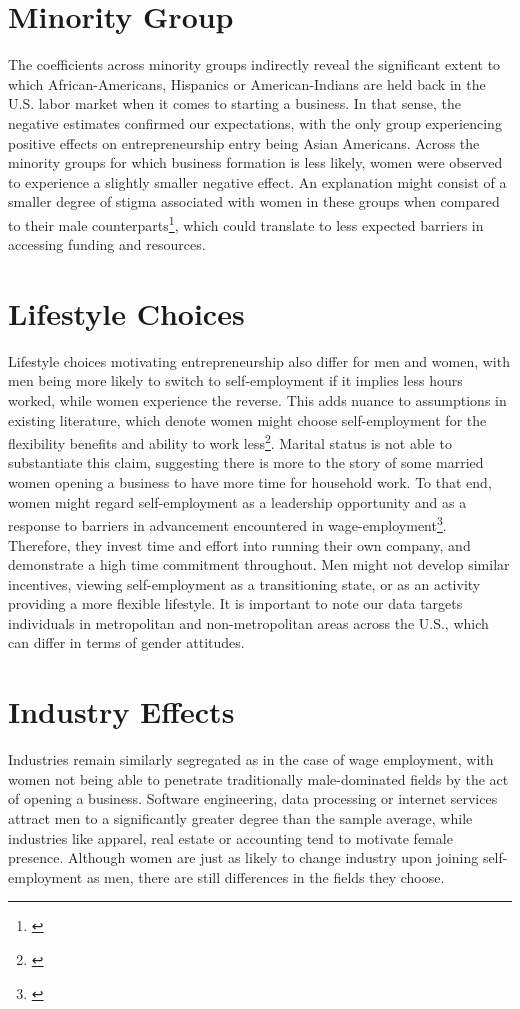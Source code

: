 \section{Minority Group}

The coefficients across minority groups indirectly reveal the significant extent to which African-Americans, Hispanics or American-Indians are held back in the U.S. labor market when it comes to starting a business. In that sense, the negative estimates confirmed our expectations, with the only group experiencing positive effects on entrepreneurship entry being Asian Americans. Across the minority groups for which business formation is less likely, women were observed to experience a slightly smaller negative effect. An explanation might consist of a smaller degree of stigma associated with women in these groups when compared to their male counterparts\footnote{\cite{AlbaRumbautMarotz2005}}, which could translate to less expected barriers in accessing funding and resources. 

\section{Lifestyle Choices}
Lifestyle choices motivating entrepreneurship also differ for men and women, with men being more likely to switch to self-employment if it implies less hours worked, while women experience the reverse. This adds nuance to assumptions in existing literature, which denote women might choose self-employment for the flexibility benefits and ability to work less\footnote{\cite{bertrand2013gender}}. Marital status is not able to substantiate this claim, suggesting there is more to the story of some married women opening a business to have more time for household work. To that end, women might regard self-employment as a leadership opportunity and as a response to barriers in advancement encountered in wage-employment\footnote{\cite{olivetti2016dp11034}}. Therefore, they invest time and effort into running their own company, and demonstrate a high time commitment throughout. Men might not develop similar incentives, viewing self-employment as a transitioning state, or as an activity providing a more flexible lifestyle. It is important to note our data targets individuals in metropolitan and non-metropolitan areas across the U.S., which can differ in terms of gender attitudes. 


\section{Industry Effects}
Industries remain similarly segregated as in the case of wage employment, with women not being able to penetrate traditionally male-dominated fields by the act of opening a business. Software engineering, data processing or internet services attract men to a significantly greater degree than the sample average, while industries like apparel, real estate or accounting tend to motivate female presence. Although women are just as likely to change industry upon joining self-employment as men, there are still differences in the fields they choose. 

